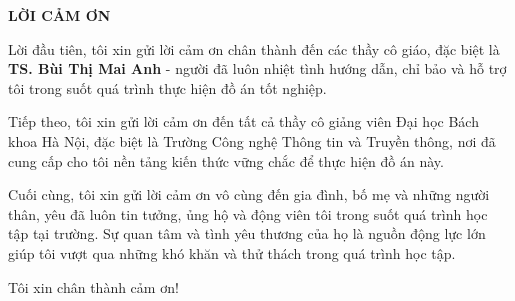 \documentclass[../DoAn.tex]{subfiles}
\begin{document}
\begin{center}
    \Large{\textbf{LỜI CẢM ƠN}}\\
\end{center}
\vspace{1cm}

Lời đầu tiên, tôi xin gửi lời cảm ơn chân thành đến các thầy cô giáo, đặc biệt là \textbf{TS. Bùi Thị Mai Anh} - người đã luôn nhiệt tình hướng dẫn, chỉ bảo và hỗ trợ tôi trong suốt quá trình thực hiện đồ án tốt nghiệp.

Tiếp theo, tôi xin gửi lời cảm ơn đến tất cả thầy cô giảng viên Đại học Bách khoa Hà Nội, đặc biệt là Trường Công nghệ Thông tin và Truyền thông, nơi đã cung cấp cho tôi nền tảng kiến thức vững chắc để thực hiện đồ án này.

Cuối cùng, tôi xin gửi lời cảm ơn vô cùng đến gia đình, bố mẹ và những người thân, yêu đã luôn tin tưởng, ủng hộ và động viên tôi trong suốt quá trình học tập tại trường. Sự quan tâm và tình yêu thương của họ là nguồn động lực lớn giúp tôi vượt qua những khó khăn và thử thách trong quá trình học tập.

Tôi xin chân thành cảm ơn!
\end{document}
